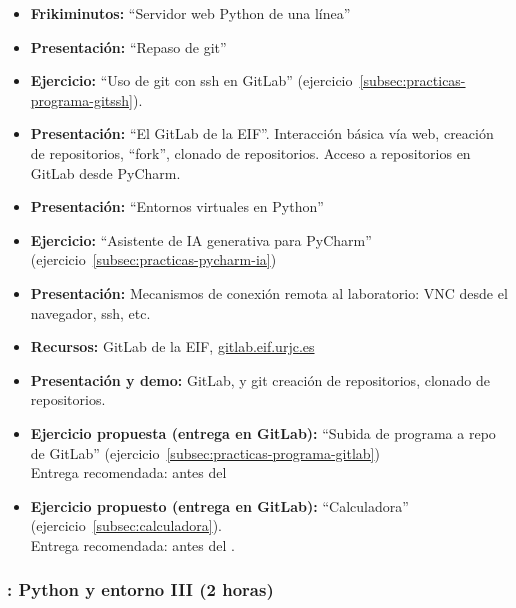 \documentclass[a4paper,12pt]{article}
\begin{document}
\begin{itemize}
\item \textbf{Frikiminutos:} ``Servidor web Python de una línea''
\item \textbf{Presentación:} ``Repaso de git''
\item \textbf{Ejercicio:} ``Uso de git con ssh en GitLab'' (ejercicio~\ref{subsec:practicas-programa-gitssh}).
\item \textbf{Presentación:} ``El GitLab de la EIF''. Interacción básica vía web, creación de repositorios, ``fork'', clonado de repositorios. Acceso a repositorios en GitLab desde PyCharm.
\item \textbf{Presentación:} ``Entornos virtuales en Python''
\item \textbf{Ejercicio:} ``Asistente de IA generativa para PyCharm'' (ejercicio~\ref{subsec:practicas-pycharm-ia})
\item \textbf{Presentación:} Mecanismos de conexión remota al laboratorio: VNC desde el navegador, ssh, etc.
\item \textbf{Recursos:} GitLab de la EIF, \url{gitlab.eif.urjc.es}
\item \textbf{Presentación y demo:} GitLab, y git creación de repositorios, clonado de repositorios.

\item \textbf{Ejercicio propuesta (entrega en GitLab):} ``Subida de programa a repo de GitLab'' (ejercicio~\ref{subsec:practicas-programa-gitlab}) \\
   Entrega recomendada: antes del \juevesC
\item \textbf{Ejercicio propuesto (entrega en GitLab):} ``Calculadora'' (ejercicio~\ref{subsec:calculadora}). \\
  Entrega recomendada: antes del \juevesC.
\end{itemize}

\subsubsection{\juevesC: Python y entorno III  (2 horas)}
\label{cal:juevesC}
\end{document}
